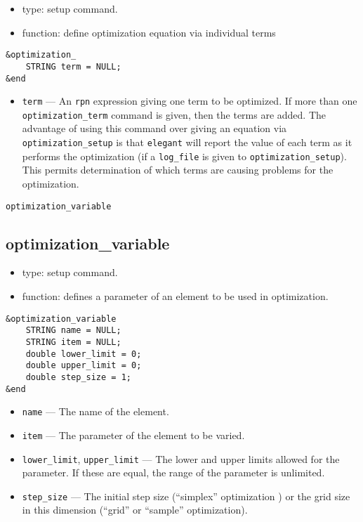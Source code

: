 \documentclass[11pt]{article}
\begin{document}
\begin{itemize}
\item type: setup command.

\item function: define optimization equation via individual terms

\end{itemize}

\begin{verbatim}
&optimization_
    STRING term = NULL;
&end
\end{verbatim}

\begin{itemize}
\item \verb|term| --- An {\tt rpn} expression giving one term to be optimized.
If more than one \verb|optimization_term| command is given, then the terms are
added.   The advantage of using this command over giving an equation via
\verb|optimization_setup| is that {\tt elegant} will report the value of
each term as it performs the optimization (if a \verb|log_file| is given to
\verb|optimization_setup|).  This permits determination of
which terms are causing problems for the optimization.
\end{itemize}

\begin{latexonly}
\newpage
\begin{center}{\Large\verb|optimization_variable|}\end{center}
\end{latexonly}
\subsection{optimization\_variable}

\begin{itemize}
\item type: setup command.
\item function: defines a parameter of an element to be used in optimization.
\end{itemize}

\begin{verbatim}
&optimization_variable
    STRING name = NULL;
    STRING item = NULL;
    double lower_limit = 0;
    double upper_limit = 0;
    double step_size = 1;
&end
\end{verbatim}

\begin{itemize}
\item \verb|name| --- The name of the element.
\item \verb|item| --- The parameter of the element to be varied.
\item \verb|lower_limit|, \verb|upper_limit| --- The lower and upper limits allowed for the parameter.  If these are
equal, the range of the parameter is unlimited.
\item \verb|step_size| --- The initial step size (``simplex'' optimization ) or the grid size in this dimension (``grid'' or ``sample'' optimization).
\end{itemize}
\end{document}

